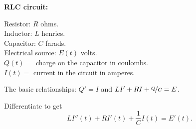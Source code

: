 \documentclass[10pt,aspectratio=169]{beamer}
\begin{document}
\begin{frame}
\textbf{RLC circuit:}

\vspace*{-12pt}
\hspace*{3in}%

\vspace*{-0.45in}

Resistor: $R$ ohms.\\
Inductor: $L$ henries.\\
Capacitor: $C$ farads.\\
Electrical source: $E(t)$ volts.\\
$Q(t) = {}$ charge on the capacitor in coulombs.\\
$I(t) = {}$ current in the circuit in amperes.

\medskip
\pause

The basic relationships: $Q' = I$ and $L I' + RI + \nicefrac{Q}{C} = E$.

\medskip
\pause

Differentiate to get
\[
L I''(t) + R I'(t) + \frac{1}{C} I(t) = E'(t) .
\]
\end{frame}
\end{document}
